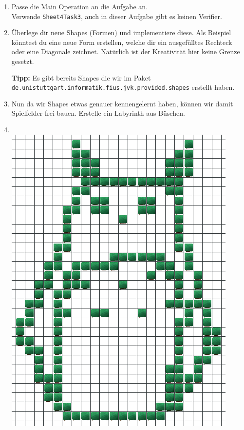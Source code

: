 
\begin{enumerate}
	\item
	Passe die Main Operation an die Aufgabe an.\\
	Verwende \lstinline{Sheet4Task3}, auch in dieser Aufgabe gibt es keinen Verifier.
	
	\item
	Überlege dir neue Shapes (Formen) und implementiere diese.
	Als Beispiel könntest du eine neue Form erstellen, welche dir ein ausgefülltes Rechteck oder eine Diagonale zeichnet.
	Natürlich ist der Kreativität hier keine Grenze gesetzt.
	
	\textbf{Tipp:} Es gibt bereits Shapes die wir im Paket \lstinline{de.unistuttgart.informatik.fius.jvk.provided.shapes} erstellt haben.
	
	\item
	Nun da wir Shapes etwas genauer kennengelernt haben, können wir damit Spielfelder frei bauen.
	Erstelle ein Labyrinth aus Büschen.

	
	\item
	\\
		\includegraphics[width=\linewidth]{./figures/playfield.png}

\end{enumerate}

\newpage
